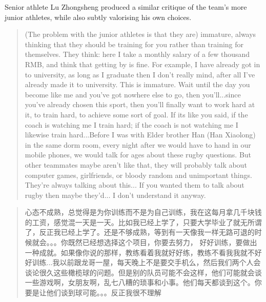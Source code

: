 \begin{CJK}{UTF8}{gbsn}
Senior athlete Lu Zhongsheng produced a similar critique of the team's more junior athletes, while also subtly valorising his own choices.

\begin{quotation}
  (The problem with the junior athletes is that they are) immature, always thinking that they should be training for you rather than training for themselves.  They think: here I take a monthly salary of a few thousand RMB, and think that getting by is fine.  For example, I have already got in to university, as long as I graduate then I don't really mind, after all I've already made it to university.  This is immature.  Wait until the day you become like me and you've got nowhere else to go, then you'll...since you've already chosen this sport, then you'll finally want to work hard at it, to train hard, to achieve some sort of goal. If its like you said, if the coach is watching me I train hard; if the coach is not watching me I likewise train hard...Before I was with Elder brother Han (Han Xiaolong) in the same dorm room, every night after we would have to hand in our mobile phones, we would talk for ages about these rugby questions. But other teammates maybe aren't like that, they will probably talk about computer games, girlfriends, or bloody random and unimportant things.  They're always talking about this... If you wanted them to talk about rugby then maybe they'd... I don't understand it anyway.
\end{quotation}

\begin{quotation}
  心态不成熟，总觉得是为你训练而不是为自己训练，我在这每月拿几千块钱的工资，感觉混一天是一天。比如我已经上学了，只要大学毕业了就无所谓了，反正我已经上学了。还是不够成熟，等到有一天像我一样无路可退的时候就会。。。你既然已经想选择这个项目，你要去努力， 好好训练，要做出一种成就。如果像你说的那样，教练看着我就好好练，教练不看我我就不好好训练...我以前跟龙哥一屋，每天晚上不是要交手机么，然后我们两个人会谈论很久这些橄榄球的问题。但是别的队员可能不会这样，他们可能就会谈一些游戏啊，女朋友啊，乱七八糟的琐事和小事。他们每天都谈到这个。你要是让他们谈到球可能。。。反正我很不理解
\end{quotation}



\end{CJK}
